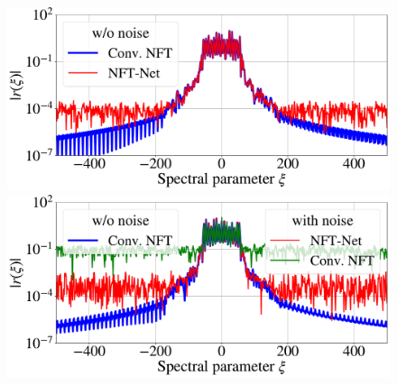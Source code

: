 \begin{figure}[htbp]
\begin{minipage}{.47\textwidth}
  \centering
  \includegraphics[width=1.\linewidth]{images/nn_nft/scirep_cont_spec_example.pdf}
\end{minipage}
\hfill
\begin{minipage}{.47\textwidth}
  \centering
  \includegraphics[width=1.\linewidth]{images/nn_nft/scirep_cont_spec_wn_example.pdf}
\end{minipage}
\\


\end{figure}
